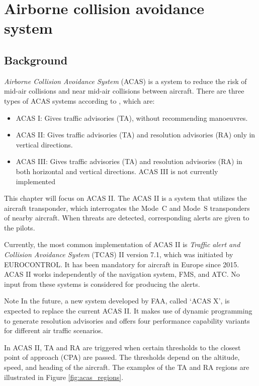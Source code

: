 \chapter{Airborne collision avoidance system}

\section{Background}

\emph{Airborne Collision Avoidance System} (ACAS) is a system to reduce the risk of mid-air collisions and near mid-air collisions between aircraft. There are three types of ACAS systems according to \cite{icaoA10V4}, which are:

\begin{itemize}
  \item ACAS I: Gives traffic advisories (TA), without recommending manoeuvres.
  \item ACAS II: Gives traffic advisories (TA) and resolution advisories (RA) only in vertical directions.
  \item ACAS III: Gives traffic advisories (TA) and resolution advisories (RA) in both horizontal and vertical directions. ACAS III is not currently implemented
\end{itemize}

This chapter will focus on ACAS II. The ACAS II is a system that utilizes the aircraft transponder, which interrogates the Mode~C and Mode~S transponders of nearby aircraft. When threats are detected, corresponding alerts are given to the pilots.

Currently, the most common implementation of ACAS II is \emph{Traffic alert and Collision Avoidance System} (TCAS) II version 7.1, which was initiated by EUROCONTROL. It has been mandatory for aircraft in Europe since 2015. ACAS II works independently of the navigation system, FMS, and ATC. No input from these systems is considered for producing the alerts. 


\begin{notebox}{Note}
In the future, a new system developed by FAA, called `ACAS X', is expected to replace the current ACAS II. It makes use of dynamic programming to generate resolution advisories and offers four performance capability variants for different air traffic scenarios. \cite{chomik2016}
\end{notebox}
  

In ACAS II, TA and RA are triggered when certain thresholds to the closest point of approach (CPA) are passed. The thresholds depend on the altitude, speed, and heading of the aircraft. The examples of the TA and RA regions are illustrated in Figure \ref{fig:acas_regions}.


